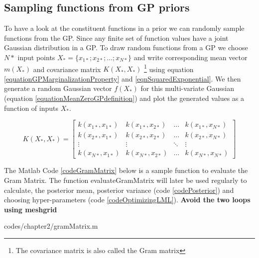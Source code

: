 \subsection{Sampling functions from GP priors}\label{subSecSamplingFunctionsGPPrior}
To have a look at the constituent functions in a prior we can randomly sample functions from the GP. Since any finite set of function values have a joint Gaussian distribution in a GP. To draw random functions from a GP we choose $N*$ input points $X_{*} = \{x_{1*}; x_{2*}; \ldots ; x_{N*}\}$ and write corresponding mean vector $m(X_{*})$ and covariance matrix $K(X_{*}, X_{*} )$ \footnote{The covariance matrix is also called the Gram matrix} using equation \ref{equationGPMarginalizationProperty} and \ref{eqnSquaredExponential}. We then generate a random Gaussian vector $f(X_{*})$ for this multi-variate Gaussian (equation \ref{equationMeanZeroGPdefinition}) and plot the generated values as a function of inputs $X_{*}$. 

\begin{equation}\label{eqnCovMatrixSquaredExponential}
K(X_{*}, X_{*} ) = \left [ \begin{matrix}
k(x_{1*}, x_{1*}) & k(x_{1*}, x_{2*}) & \ldots & k(x_{1*}, x_{N*})
\\ k(x_{2*}, x_{1*}) & k(x_{2*}, x_{2*}) & \ldots & k(x_{2*}, x_{N*})
\\ \vdots & \vdots & \ddots & \vdots
\\ k(x_{N*}, x_{1*}) & k(x_{N*}, x_{2*}) & \ldots & k(x_{N*}, x_{N*})
\end{matrix} \right ] 
\end{equation}

The Matlab Code \ref{codeGramMatrix} below is a sample function to evaluate the Gram Matrix. The function  evaluateGramMatrix will later be used regularly to calculate, the posterior mean, posterior variance (code \ref{codePosterior}) and choosing hyper-parameters (code \ref{codeOptimizingLML}). \textbf{Avoid the two loops using meshgrid}

\begin{mdframed}[hidealllines=true,backgroundcolor=lightgray!20]

                    {codes/chapter2/gramMatrix.m}
\end{mdframed}

